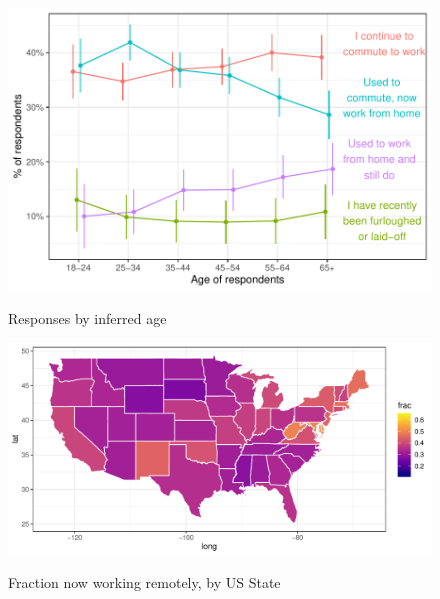 \documentclass[12pt]{article}
\begin{document}
\begin{figure}
  \caption{Responses by inferred age} \label{fig:by_age}
\centering
\begin{minipage}{1.0 \linewidth}
  \includegraphics[width = \linewidth]{plots/by_age.pdf} \\
  \begin{footnotesize}
    \begin{singlespace}
    \end{singlespace}
    \end{footnotesize}
\end{minipage}
\end{figure} 



\begin{figure}
  \caption{Fraction now working remotely, by US State} \label{fig:geo_wfh}
\centering
\begin{minipage}{1.0 \linewidth}
  \includegraphics[width = \linewidth]{plots/geo_wfh.pdf} \\
  \begin{footnotesize}
    \end{footnotesize}
\end{minipage}
\end{figure} 
\end{document}
